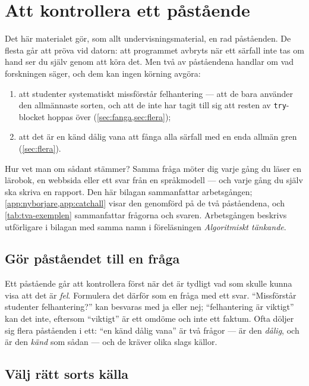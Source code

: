 \chapter{Att kontrollera ett påstående}
\label{app:verifiera}

Det här materialet gör, som allt undervisningsmaterial, en rad
påståenden.  De flesta går att pröva vid datorn: att programmet avbryts
när ett särfall inte tas om hand ser du själv genom att köra det.  Men
två av påståendena handlar om vad forskningen säger, och dem kan ingen
körning avgöra:
\begin{enumerate}
  \item att studenter systematiskt missförstår felhantering --- att de
    bara använder den allmännaste sorten, och att de inte har tagit till
    sig att resten av \texttt{try}-blocket hoppas över
    (\cref{sec:fanga,sec:flera});
  \item att det är en känd dålig vana att fånga alla särfall med en enda
    allmän gren (\cref{sec:flera}).
\end{enumerate}
Hur vet man om sådant stämmer?  Samma fråga möter dig varje gång du läser
en lärobok, en webbsida eller ett svar från en språkmodell --- och varje
gång du själv ska skriva en rapport.  Den här bilagan sammanfattar
arbetsgången; \cref{app:nyborjare,app:catchall} visar den genomförd på
de två påståendena, och \cref{tab:tva-exemplen} sammanfattar frågorna och
svaren.  Arbetsgången beskrivs utförligare i bilagan med samma namn i
föreläsningen \emph{Algoritmiskt tänkande}.

\section{Gör påståendet till en fråga}

Ett påstående går att kontrollera först när det är tydligt vad som skulle
kunna visa att det är \emph{fel}.  Formulera det därför som en fråga med
ett svar.  \enquote{Missförstår studenter felhantering?} kan besvaras med
ja eller nej; \enquote{felhantering är viktigt} kan det inte, eftersom
\enquote{viktigt} är ett omdöme och inte ett faktum.  Ofta döljer sig
flera påståenden i ett: \enquote{en känd dålig vana} är två frågor ---
är den \emph{dålig}, och är den \emph{känd} som sådan --- och de kräver
olika slags källor.

\section{Välj rätt sorts källa}

